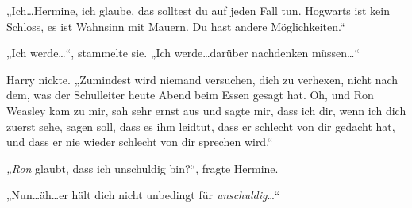 „Ich…Hermine, ich glaube, das solltest du auf jeden Fall tun. Hogwarts ist kein Schloss, es ist Wahnsinn mit Mauern. Du hast andere Möglichkeiten.“

„Ich werde…“, stammelte sie. „Ich werde…darüber nachdenken müssen…“

Harry nickte. „Zumindest wird niemand versuchen, dich zu verhexen, nicht nach dem, was der Schulleiter heute Abend beim Essen gesagt hat. Oh, und Ron Weasley kam zu mir, sah sehr ernst aus und sagte mir, dass ich dir, wenn ich dich zuerst sehe, sagen soll, dass es ihm leidtut, dass er schlecht von dir gedacht hat, und dass er nie wieder schlecht von dir sprechen wird.“

\emph{„Ron} glaubt, dass ich unschuldig bin?“, fragte Hermine.

„Nun…äh…er hält dich nicht unbedingt für \emph{unschuldig}…“

\later









